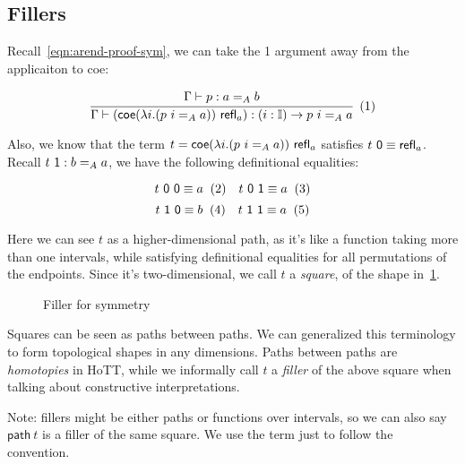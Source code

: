 

\subsection{Fillers}
\label{subsec:fill}

Recall~\ref{eqn:arend-proof-sym}, we can take the \textsf 1 argument away from
the applicaiton to \textsf{coe}:

\[
  \cfrac{
    \Gamma \vdash p : a =_A b
  }{
    \Gamma \vdash (\textsf{coe}
    (\lambda i. (p~i =_A a))~\refl_a)
    : (i : \mathbb I) \rightarrow p~i =_A a
  }
  \xtag \label{eqn:coe-a-b-path-gen-eta}
\]

Also, we know that the term $t = \textsf{coe} (\lambda i. (p~i =_A a))~\textsf{refl}_a$
satisfies $t~\textsf 0 \equiv \textsf{refl}_a$.
Recall $t~\textsf 1 : b =_A a$,
we have the following definitional equalities:

\[
  t~\textsf 0~\textsf 0 \equiv a \xtag \quad
  t~\textsf 0~\textsf 1 \equiv a \xtag
\]
\[
  t~\textsf 1~\textsf 0 \equiv b \xtag \quad
  t~\textsf 1~\textsf 1 \equiv a \xtag
\]

Here we can see $t$ as a higher-dimensional path,
as it's like a function taking more than one intervals,
while satisfying definitional equalities for all permutations of the endpoints.
Since it's two-dimensional, we call $t$ a \textit{square},
of the shape in~\cref{fig:filler}.

\begin{figure}
\begin{center}
\end{center}
\caption{Filler for symmetry}
\label{fig:filler}
\end{figure}

Squares can be seen as paths between paths.
We can generalized this terminology to form topological shapes in any dimensions.
Paths between paths are \textit{homotopies} in HoTT,
while we informally call $t$ a \textit{filler} of the above square
when talking about constructive interpretations.

Note: fillers might be either paths or functions over intervals,
so we can also say $\textsf{path}~t$ is a filler of the same square.
We use the term just to follow the convention.

